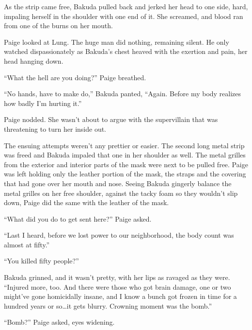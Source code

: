 As the strip came free, Bakuda pulled back and jerked her head to one side, hard, impaling herself in the shoulder with one end of it.  She screamed, and blood ran from one of the burns on her mouth.



Paige looked at Lung.  The huge man did nothing, remaining silent.  He only watched dispassionately as Bakuda's chest heaved with the exertion and pain, her head hanging down.



``What the hell are you doing?'' Paige breathed.



``No hands, have to make do,'' Bakuda panted, ``Again.  Before my body realizes how badly I'm hurting it.''



Paige nodded.  She wasn't about to argue with the supervillain that was threatening to turn her inside out.



The ensuing attempts weren't any prettier or easier.  The second long metal strip was freed and Bakuda impaled that one in her shoulder as well.  The metal grilles from the exterior and interior parts of the mask were next to be pulled free.  Paige was left holding only the leather portion of the mask, the straps and the covering that had gone over her mouth and nose.  Seeing Bakuda gingerly balance the metal grilles on her free shoulder, against the tacky foam so they wouldn't slip down, Paige did the same with the leather of the mask.



``What did you do to get sent here?'' Paige asked.



``Last I heard, before we lost power to our neighborhood, the body count was almost at fifty.''



``You killed fifty people?''



Bakuda grinned, and it wasn't pretty, with her lips as ravaged as they were.  ``Injured more, too.  And there were those who got brain damage, one or two might've gone homicidally insane, and I know a bunch got frozen in time for a hundred years or so\ldots it gets blurry.  Crowning moment was the bomb.''



``Bomb?'' Paige asked, eyes widening.



